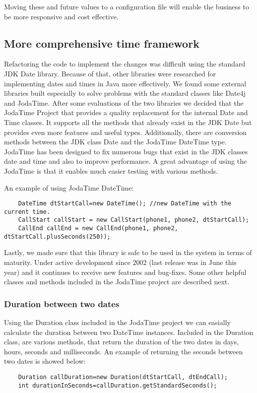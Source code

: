 Moving these and future values to a configuration file will enable the business to be more responsive and cost effective.

\subsection*{More comprehensive time framework}
Refactoring the code to implement the changes was difficult using the standard JDK Date library. Because of that, other libraries were researched for implementing dates and times in Java more effectively. We found some external libraries built especially to solve problems with the standard classes like Date4j and JodaTime. After some evaluations of the two libraries we decided that the JodaTime Project that provides a quality replacement for the internal Date and Time classes. It supports all the methods that already exist in the JDK Date but provides even more features and useful types. Additionally, there are conversion methods between the JDK class Date and the JodaTime DateTime type. JodaTime has been designed to fix numerous bugs that exist in the JDK classes date and time and also to improve performance. A great advantage of using the JodaTime is that it enables much easier testing with various methods. 

An example of using JodaTime DateTime:
\begin{lstlisting}
	DateTime dtStartCall=new DateTime(); //new DateTime with the current time. 
	CallStart callStart = new CallStart(phone1, phone2, dtStartCall);
	CallEnd callEnd = new CallEnd(phone1, phone2, dtStartCall.plusSeconds(250));
\end{lstlisting}

Lastly, we made sure that this library is safe to be used in the system in terms of maturity. Under active development since 2002 (last release was in June this year) and it continues to receive new features and bug-fixes. Some other helpful classes and methods included in the JodaTime project are described next.

\subsubsection*{Duration between two dates}
Using the Duration class included in the JodaTime project we can easially calculate the duration between two DateTime instances. Included in the Duration class, are various methods, that return the duration of the two dates in days, hours, seconds and milliseconds. An example of returning the seconds between two dates is showed below:
\begin{lstlisting}
	Duration callDuration=new Duration(dtStartCall, dtEndCall);
	int durationInSeconds=callDuration.getStandardSeconds();
\end{lstlisting}

